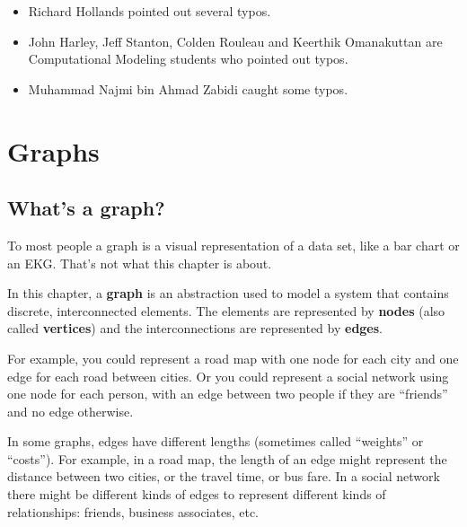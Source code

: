 \documentclass[10pt]{book}
\begin{document}
\small

\begin{itemize}

\item Richard Hollands pointed out several typos.

\item John Harley, Jeff Stanton, Colden Rouleau and
Keerthik Omanakuttan are Computational Modeling students who
pointed out typos.

\item Muhammad Najmi bin Ahmad Zabidi caught some typos.



\end{itemize}

\normalsize

\clearemptydoublepage

\begin{latexonly}

\tableofcontents

\clearemptydoublepage

\end{latexonly}

\mainmatter


\chapter{Graphs}

\section{What's a graph?}

To most people a graph is a visual representation of a data set, like
a bar chart or an EKG.  That's not what this chapter is about.

In this chapter, a {\bf graph} is an abstraction used to
model a system that contains discrete, interconnected elements.  The
elements are represented by {\bf nodes} (also called {\bf vertices})
and the interconnections are represented by {\bf edges}.

For example, you could represent a road map with one node for each
city and one edge for each road between cities.  Or you could
represent a social network using one node for each person, with an
edge between two people if they are ``friends'' and no edge otherwise.

In some graphs, edges have different lengths (sometimes
called ``weights'' or ``costs'').  For example, in a road map, the
length of an edge might represent the distance between
two cities, or the travel time, or bus fare.
In a social network there might be different kinds of
edges to represent different kinds of relationships: friends,
business associates, etc.
\end{document}
